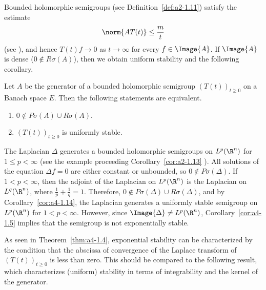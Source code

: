Bounded holomorphic semigroups (see Definition~\ref{def:a2-1.11}) satisfy the estimate
\[\norm{AT(t)} \leq \frac{m}{t}\]
(see \textcite[p.33]{goldstein:1985a}), and hence $T(t)f \to 0$ as $t \to \infty$
for every $f \in \Image{A}$. 
If\/ $\Image{A}$ is dense (\ie $0 \not\in R\sigma(A)$), then we obtain
uniform stability and the following corollary.
\begin{corollary}\label{cor:a4-1.14}
Let $A$ be the generator of a bounded holomorphic
semigroup $(T(t))_{t \geq 0}$ on a Banach space $E$. 
Then the following statements are equivalent.
\begin{enumerate}[\upshape (a)]
\item 
$0 \not\in P\sigma(A) \cup R\sigma(A)$.

\item 
$(T(t))_{t \geq 0}$ is uniformly stable.

\end{enumerate}
\end{corollary}
\begin{example}\label{ex:a4-15}
The Laplacian $\Delta$ generates a bounded holomorphic semigroups on $L^{p}(\R^{n})$ for $1 \leq p < \infty$ (see the example proceeding
Corollary~\ref{cor:a2-1.13} ).
All solutions of the equation $\Delta f = 0$ are either constant
or unbounded, so $0 \not\in P\sigma(\Delta)$. 
If\/ $1 < p < \infty$, then the adjoint
of the Laplacian on $L^{p}(\R^{n})$ is the Laplacian on $L^{q}(\R^{n})$, where
$\frac{1}{p} + \frac{1}{q} = 1$. 
Therefore, $0 \not\in P\sigma(\Delta) \cup R\sigma(\Delta)$, and by Corollary~\ref{cor:a4-1.14},
the Laplacian generates a uniformly stable semigroup on  $L^{p}(\R^{n})$
for $1 < p < \infty$. However, since $\Image{ \Delta} \not= L^{p}(\R^{n})$, Corollary~\ref{cor:a4-1.5} implies that the semigroup is not exponentially stable. %
\end{example}
As seen in Theorem~\ref{thm:a4-1.4}, exponential stability can be characterized by the condition that the abscissa of convergence of the Laplace transform of\/ $(T(t))_{t \geq 0}$ is less than zero. 
This should be compared to the following result, which characterizes (uniform) stability in terms of integrability and the kernel of the generator.
